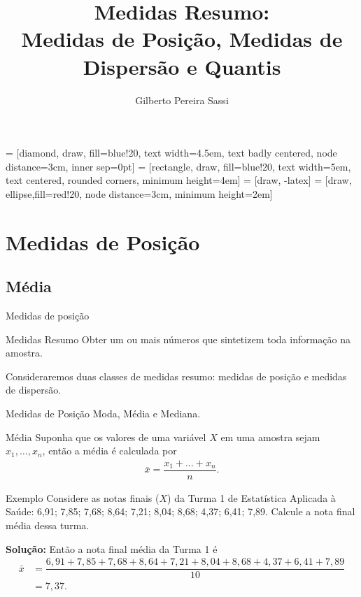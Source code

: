 \documentclass[8pt]{beamer}
\date{}
\title[Medidas Resumo]{Medidas Resumo: \\ Medidas de Posição, Medidas de Dispersão e Quantis}
\author[Gilberto Sassi]{Gilberto Pereira Sassi}
\institute[IME -- UFBA]{Universidade Federal da Bahia \\ Instituto de Matem\'{a}tica e Estat\'{i}stica\\ Departamento de Estat\'{i}stica }
\begin{document}
	
 = [diamond, draw, fill=blue!20, 
text width=4.5em, text badly centered, node distance=3cm, inner sep=0pt]
 = [rectangle, draw, fill=blue!20, 
text width=5em, text centered, rounded corners, minimum height=4em]
 = [draw, -latex]
 = [draw, ellipse,fill=red!20, node distance=3cm,
minimum height=2em]
	
\begin{frame}{}
	\maketitle
\end{frame}

\section{Medidas de Posição}

\subsection{Média}

\begin{frame}{Medidas de posição}
  \begin{block}{Medidas Resumo}
   Obter um ou mais números que sintetizem toda informação na amostra. 
   
   Consideraremos duas classes de medidas resumo: medidas de posição e medidas de dispersão.
  \end{block}

  \begin{block}{Medidas de Posição}
   Moda, Média e Mediana.
  \end{block}
  
  \begin{block}{Média}
    Suponha que os valores de uma variável $X$ em uma amostra sejam $x_1, \dots, x_n$, então a média é calculada por
    \begin{align*}
     \bar{x} = \dfrac{x_1+ \dots + x_n}{n}.
   \end{align*}
  \end{block}
\end{frame}

\begin{frame}{Exemplo}
   Considere as notas finais ($X$) da Turma 1 de Estatística Aplicada à Saúde: 6,91; 7,85; 7,68; 8,64; 7,21; 8,04; 8,68; 4,37; 6,41; 7,89. Calcule a nota final média dessa turma.
   \vfill
   
   \textbf{Solução:} Então a nota final média da Turma 1 é 
   \begin{align*}
    \bar{x} &= \dfrac{6,91 +7,85+ 7,68+ 8,64+ 7,21+ 8,04+ 8,68+ 4,37+ 6,41+ 7,89}{10}\\
    &= 7,37.
   \end{align*}

\end{frame}
\end{document}
